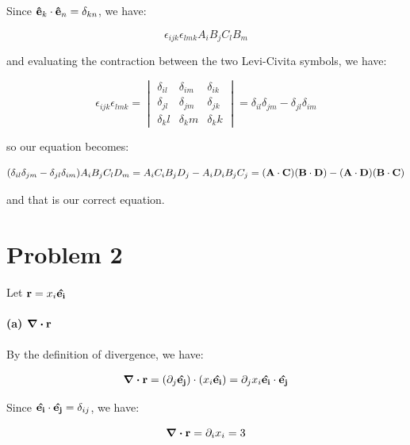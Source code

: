 \documentclass{article}
\numberwithin{equation}{section}
\newcommand{\vbh}[1]{\vb{\hat{#1}}}
\begin{document}
Since $\vbh{e}_k \cdot \vbh{e}_n =  \delta_{kn}$, we have:

\begin{equation}
    \epsilon_{ijk} \epsilon_{lmk} A_i B_j C_l B_m 
\end{equation}

and evaluating the contraction between the two Levi-Civita symbols, we have:

\begin{equation}
    \epsilon_{ijk} \epsilon_{lmk} = \begin{vmatrix}
        \delta_{il} & \delta_{im} &  \delta_{ik} \\ \delta_{jl} & \delta_{jm} &  \delta_{jk} \\ \delta_kl & \delta_km &  \delta_kk
    \end{vmatrix} = \delta_{il} \delta_{jm} - \delta_{jl} \delta_{im}
\end{equation}

so our equation becomes:

\begin{equation}
    (\delta_{il} \delta_{jm} - \delta_{jl} \delta_{im}) A_i B_j C_l D_m = A_i C_i B_j D_j - A_i D_i B_j C_j = (\vb{A} \cdot \vb{C})(\vb{B} \cdot \vb{D}) - (\vb{A} \cdot \vb{D}) (\vb{B} \cdot \vb{C})
\end{equation}

and that is our correct equation.

\section{Problem 2}

Let $\vb{r} = x_i \vbh{e_i}$

\paragraph{(a) $\div \vb{r}$}

By the definition of divergence, we have:

\begin{equation}
    \begin{split}
        \div \vb{r} = (\partial_j \vbh{e_j}) \cdot (x_i \vbh{e_i}) = \partial_j x_i \vbh{e_i} \cdot \vbh{e_j}
    \end{split}
\end{equation}

Since $\vbh{e_i} \cdot \vbh{e_j} = \delta_{ij}$, we have:

\begin{equation}
     \div \vb{r} = \partial_i x_i = 3
\end{equation}
\end{document}

